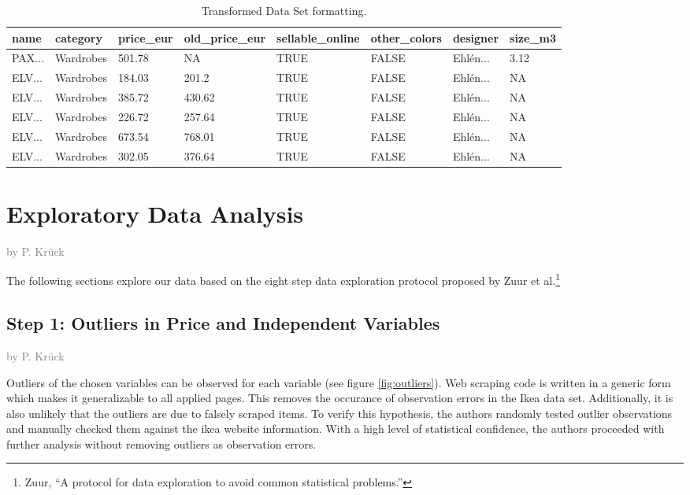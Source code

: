 \documentclass[a4paper, nobind]{templates/ociamthesis}
\begin{document}
\begin{table}

\caption{\label{tab:tidy-ikea}Transformed Data Set formatting.}
\centering
\fontsize{8}{10}\selectfont
\begin{tabular}[t]{l|l|l|l|l|l|l|l}
\hline
name & category & price\_eur & old\_price\_eur & sellable\_online & other\_colors & designer & size\_m3\\
\hline
PAX... & Wardrobes & 501.78 & NA & TRUE & FALSE & Ehlén... & 3.12\\
\hline
ELV... & Wardrobes & 184.03 & 201.2 & TRUE & FALSE & Ehlén... & NA\\
\hline
ELV... & Wardrobes & 385.72 & 430.62 & TRUE & FALSE & Ehlén... & NA\\
\hline
ELV... & Wardrobes & 226.72 & 257.64 & TRUE & FALSE & Ehlén... & NA\\
\hline
ELV... & Wardrobes & 673.54 & 768.01 & TRUE & FALSE & Ehlén... & NA\\
\hline
ELV... & Wardrobes & 302.05 & 376.64 & TRUE & FALSE & Ehlén... & NA\\
\hline
\end{tabular}
\end{table}

\hypertarget{tbd}{%
\section{Exploratory Data Analysis}\label{tbd}}

\textcolor{gray}{by P. Krück}

The following sections explore our data based on the eight step data exploration protocol proposed by Zuur et al.\footnote{Zuur, ``A protocol for data exploration to avoid common statistical problems.''}

\hypertarget{outliers}{%
\subsection{Step 1: Outliers in Price and Independent Variables}\label{outliers}}

\textcolor{gray}{by P. Krück}

Outliers of the chosen variables can be observed for each variable (see figure \ref{fig:outliers}).
Web scraping code is written in a generic form which makes it generalizable to all applied pages. This removes the occurance of observation errors in the Ikea data set. Additionally, it is also unlikely that the outliers are due to falsely scraped items.
To verify this hypothesis, the authors randomly tested outlier observations and manually checked them against the ikea website information. With a high level of statistical confidence, the authors proceeded with further analysis without removing outliers as observation errors.
\end{document}
